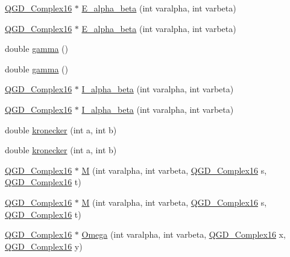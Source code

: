 \begin{DoxyCompactItemize}
\item 
\hyperlink{struct_q_g_d___complex16}{Q\+G\+D\+\_\+\+Complex16} $\ast$ \hyperlink{class_random___unitary_a52313a597b3167368c8b38bacb9f08b2}{E\+\_\+alpha\+\_\+beta} (int varalpha, int varbeta)
\item 
\hyperlink{struct_q_g_d___complex16}{Q\+G\+D\+\_\+\+Complex16} $\ast$ \hyperlink{class_random___unitary_ae878c9ab32e5dbc6258c637987b28c46}{E\+\_\+alpha\+\_\+beta} (int varalpha, int varbeta)
\item 
double \hyperlink{class_random___unitary_a298d1b7fc0a39ffcc8f8de065acd78f8}{gamma} ()
\item 
double \hyperlink{class_random___unitary_a298d1b7fc0a39ffcc8f8de065acd78f8}{gamma} ()
\item 
\hyperlink{struct_q_g_d___complex16}{Q\+G\+D\+\_\+\+Complex16} $\ast$ \hyperlink{class_random___unitary_a60a417454200c6e38e9f71b703ddc2ff}{I\+\_\+alpha\+\_\+beta} (int varalpha, int varbeta)
\item 
\hyperlink{struct_q_g_d___complex16}{Q\+G\+D\+\_\+\+Complex16} $\ast$ \hyperlink{class_random___unitary_a779864d1d2485c8c7cca750e5c332b39}{I\+\_\+alpha\+\_\+beta} (int varalpha, int varbeta)
\item 
double \hyperlink{class_random___unitary_ae5a3c0359574e6483064e56572463f1b}{kronecker} (int a, int b)
\item 
double \hyperlink{class_random___unitary_ae5a3c0359574e6483064e56572463f1b}{kronecker} (int a, int b)
\item 
\hyperlink{struct_q_g_d___complex16}{Q\+G\+D\+\_\+\+Complex16} $\ast$ \hyperlink{class_random___unitary_a0a0f5dabf78c826af773b9bd8b192d4b}{M} (int varalpha, int varbeta, \hyperlink{struct_q_g_d___complex16}{Q\+G\+D\+\_\+\+Complex16} s, \hyperlink{struct_q_g_d___complex16}{Q\+G\+D\+\_\+\+Complex16} t)
\item 
\hyperlink{struct_q_g_d___complex16}{Q\+G\+D\+\_\+\+Complex16} $\ast$ \hyperlink{class_random___unitary_a3592b5740dbc7aa0e15a52b4358d3775}{M} (int varalpha, int varbeta, \hyperlink{struct_q_g_d___complex16}{Q\+G\+D\+\_\+\+Complex16} s, \hyperlink{struct_q_g_d___complex16}{Q\+G\+D\+\_\+\+Complex16} t)
\item 
\hyperlink{struct_q_g_d___complex16}{Q\+G\+D\+\_\+\+Complex16} $\ast$ \hyperlink{class_random___unitary_a1dfd08ca71a8609ae71325a9f40e7570}{Omega} (int varalpha, int varbeta, \hyperlink{struct_q_g_d___complex16}{Q\+G\+D\+\_\+\+Complex16} x, \hyperlink{struct_q_g_d___complex16}{Q\+G\+D\+\_\+\+Complex16} y)
\item 

\end{DoxyCompactItemize}
